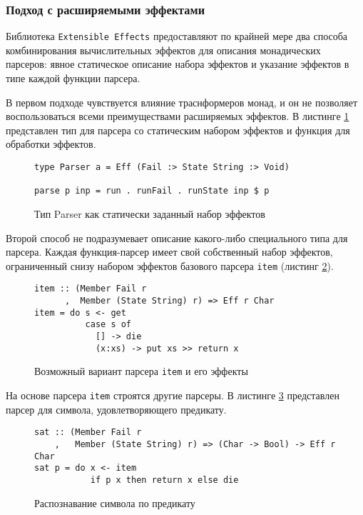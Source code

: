 \newpage

\subsubsection{Подход с расширяемыми эффектами}

Библиотека \lstinline{Extensible Effects} предоставляют по крайней мере два способа комбинирования вычислительных эффектов для описания монадических парсеров: явное статическое описание набора эффектов и указание эффектов в типе каждой функции парсера. 

В первом подходе чувствуется влияние траснформеров монад, и он не позволяет воспользоваться всеми преимуществами расширяемых эффектов. В листинге \ref{listing:ExtEffectsParser} представлен тип для парсера со статическим набором эффектов и функция для обработки эффектов.

\begin{figure}[h]
\begin{lstlisting}
type Parser a = Eff (Fail :> State String :> Void)

parse p inp = run . runFail . runState inp $ p 
\end{lstlisting}
\caption{Тип Parser как статически заданный набор эффектов}
\label{listing:ExtEffectsParser}
\end{figure}

Второй способ не подразумевает описание какого-либо специального типа для парсера. Каждая функция-парсер имеет свой собственный набор эффектов, ограниченный снизу набором эффектов базового парсера \lstinline{item} (листинг \ref{listing:ExtEffectsItem}).

\begin{figure}[h]
\begin{lstlisting}
item :: (Member Fail r
      ,  Member (State String) r) => Eff r Char
item = do s <- get
          case s of 
            [] -> die
            (x:xs) -> put xs >> return x 
\end{lstlisting}
\caption{Возможный вариант парсера \lstinline{item} и его эффекты}
\label{listing:ExtEffectsItem}
\end{figure}

На основе парсера \lstinline{item} строятся другие парсеры. В листинге \ref{listing:ExtEffectsSat} представлен парсер для символа, удовлетворяющего предикату. 

\begin{figure}[h]
\begin{lstlisting}
sat :: (Member Fail r
    ,   Member (State String) r) => (Char -> Bool) -> Eff r Char
sat p = do x <- item
           if p x then return x else die
\end{lstlisting}
\caption{Распознавание символа по предикату}
\label{listing:ExtEffectsSat}
\end{figure} 

